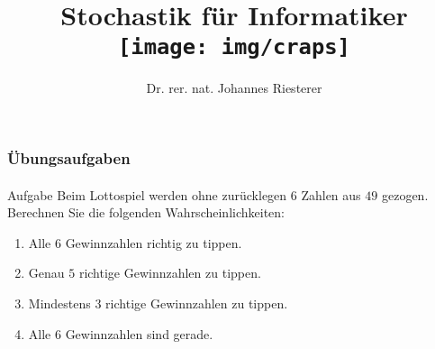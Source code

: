 \documentclass{beamer}
\begin{document}
\title[Stochastik] %
{Stochastik für Informatiker
\\
\texttt{[image: img/craps]}
}
\subtitle{}
\author[Dr. Johannes Riesterer] %
{Dr.  rer. nat. Johannes Riesterer}

\date[KPT 2004] %
{}

\subject{Stochastik}

\frame{\titlepage}

\begin{frame}
    \frametitle{Übungsaufgaben}
\framesubtitle{}
\begin{block}{Aufgabe}
Beim Lottospiel werden ohne zurücklegen $6$ Zahlen aus $49$ gezogen. Berechnen Sie die folgenden Wahrscheinlichkeiten:
\begin{enumerate}
\item Alle $6$ Gewinnzahlen richtig zu tippen.
\item Genau $5$ richtige Gewinnzahlen zu tippen.
\item Mindestens $3$ richtige Gewinnzahlen zu tippen.
\item Alle $6$ Gewinnzahlen sind gerade.
\end{enumerate}
\end{block}
 \end{frame}
\end{document}
